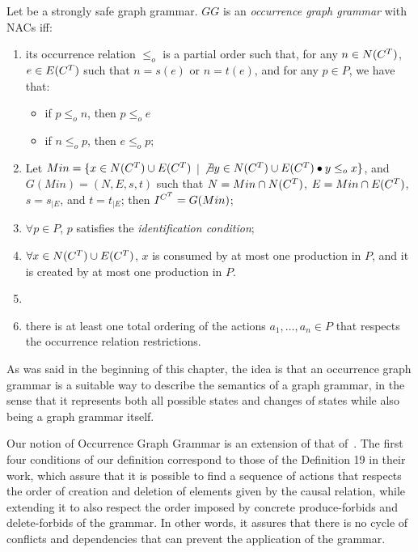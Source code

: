 \begin{definition}\label{def:ogg} Let \doublyTypedGraphGrammarCore{} be a strongly safe graph grammar. $GG$ is an \emph{occurrence graph grammar} with NACs iff:

  \begin{enumerate}
    \item its occurrence relation $\leq_{o}$ is a partial order such that, for any \mbox{$n \in N(C^T)$}, \mbox{$e \in E(C^T)$} such that $n = s(e)$ or $n = t(e)$, and for any $p \in P$, we have that:
      \begin{itemize}
        \item if $p \leq_o n$, then $p \leq_o e$
        \item if $n \leq_o p$, then $e \leq_o p$;
      \end{itemize}
    \item Let $Min = \{x \in N(C^T) \cup E(C^T)$ $|$ $\not\exists y \in N(C^T) \cup E(C^T)\bullet y \leq_o x \}$, and $G(Min) = \left(N,E,s,t\right)$ such that $N = Min \cap N(C^T)$, $E = Min \cap E(C^T)$, $s = s_{|E}$, and $t = t_{|E}$; then $\mbox{\ensuremath{I^{C^T}}} = G(Min)$;
    \item $\forall p \in P$, $p$ satisfies the \emph{identification condition};
    \item $\forall x \in N(C^T) \cup E(C^T)$, $x$ is consumed by at most one production in $P$, and it is created by at most one production in $P$.
    \item {}
    \item there is at least one total ordering of the actions $a_1,\ldots,a_n \in P$ that respects the occurrence relation restrictions.
  \end{enumerate}
\end{definition}

As was said in the beginning of this chapter, the idea is that an occurrence graph grammar is a suitable way to describe the semantics of a graph grammar, in the sense that it represents both all possible states and changes of states while also being a graph grammar itself.

Our notion of Occurrence Graph Grammar is an extension of that of~\cite{Corradini1996}. The first four conditions of our definition correspond to those of the Definition 19 in their work, which assure that it is possible to find a sequence of actions that respects the order of creation and deletion of elements given by the causal relation, while extending it to also respect the order imposed by concrete produce-forbids and delete-forbids of the grammar. In other words, it assures that there is no cycle of conflicts and dependencies that can prevent the application of the grammar.

